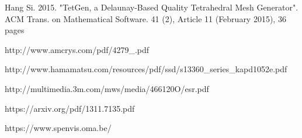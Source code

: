 \documentclass[12pt, a4paper,titlepage]{article}
\numberwithin{equation}{section}
\numberwithin{figure}{section}
\begin{document}
\begin{thebibliography}{99}
 Hang Si. 2015. "TetGen, a Delaunay-Based Quality Tetrahedral Mesh Generator". ACM Trans. on Mathematical Software. 41 (2), Article 11 (February 2015), 36 pages

 http://www.amcrys.com/pdf/4279\_.pdf

 http://www.hamamatsu.com/resources/pdf/ssd/s13360\_series\_kapd1052e.pdf

 http://multimedia.3m.com/mws/media/466120O/esr.pdf
 
 https://arxiv.org/pdf/1311.7135.pdf
 
 
 https://www.spenvis.oma.be/

\end{thebibliography}

\pagebreak

\listoffigures


\end{document}
